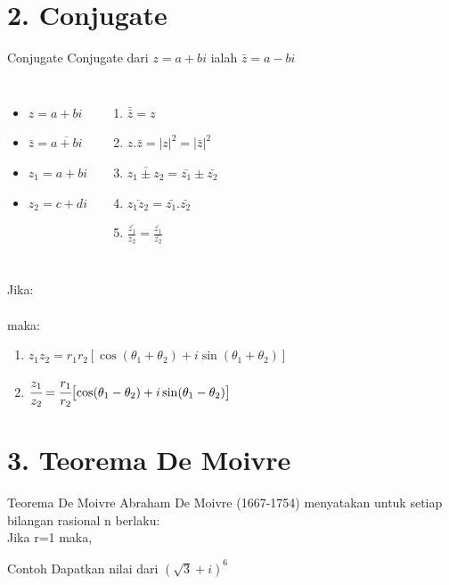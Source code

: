 \documentclass{beamer}
\begin{document}
\section{2. Conjugate}
\begin{frame}[t, fragile]{Conjugate}
Conjugate dari $z=a+bi$ ialah \underline{$\bar{z}=a-bi$}\\
\vskip5pt
\begin{columns}
\begin{itemize}
\item $z=a+bi$
\item $\bar{z}=\overline{a+bi}$
\item $z_1=a+bi$
\item $z_2=c+di$
\end{itemize}
\begin{enumerate}
\item $\bar{\bar{z}}=z$
\item $z.\bar{z}=|z|^2=|\bar{z}|^2$
\item $\overline{z_1\pm z_2}=\bar{z_1}\pm \bar{z_2}$
\item $\overline{z_1 z_2} = \bar{z_1} . \bar {z_2}$
\item $\overline{\frac{z_1}{z_2}} = \frac{\bar{z_1}}{\bar{z_2}}$
\end{enumerate}
\end{columns}
Jika: \\ 
\hskip30pt \\
maka:\\
\begin{enumerate}
\item $z_1 z_2 = r_1 r_2[\cos (\theta_1+\theta_2) + i \sin (\theta_1+\theta_2)]$
\item $\cfrac{z_1}{z_2}=\cfrac{r_1}{r_2} \bigl[{\cos (\theta_1-\theta_2) + i \sin (\theta_1-\theta_2)}\bigr]$
\end{enumerate}
\end{frame}

\section{3. Teorema De Moivre}
\begin{frame}[t, fragile]{Teorema De Moivre}
Abraham De Moivre (1667-1754) menyatakan untuk setiap bilangan rasional n berlaku:\\
\vskip10pt
\hskip10pt 
\vskip10pt
Jika r=1 maka,
\vskip10pt
\hskip10pt 
\vskip10pt
\begin{exampleblock}{Contoh}
Dapatkan nilai dari $(\sqrt{3}+i)^6$
\end{exampleblock}
\end{frame}
\end{document}

